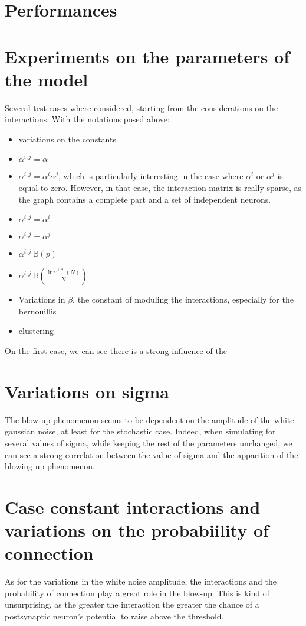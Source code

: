 \section{Performances}

\section{Experiments on the parameters of the model}
Several test cases where considered, starting from the considerations on the interactions. With the notations posed above:\\
	\begin{itemize}
		\item variations on the constants
		\item $ \alpha^{i,j}=\alpha $
		\item $ \alpha^{i,j}=\alpha^i\alpha^j $, which is particularly interesting in the case where $ \alpha^i\text{ or }\alpha^j $ is equal to zero. However, in that case, the interaction matrix is really sparse, as the graph contains a complete part and a set of independent neurons.
		\item $ \alpha^{i,j}=\alpha^i $
		\item $ \alpha^{i,j}=\alpha^j $
		\item $ \alpha^{i,j}~\mathbb{B}(p) $
		\item $ \alpha^{i,j}~\mathbb{B}(\frac{\ln^{\frac{1}{2},1,2}(N)}{N}) $
		\item Variations in $ \beta $, the constant of moduling the interactions, especially for the bernouillis
		\item clustering
	\end{itemize}
	On the first case, we can see there is a strong influence of the 

	\section{Variations on sigma}
	The blow up phenomenon seems to be dependent on the amplitude of the white gaussian noise, at least for the stochastic case. Indeed, when simulating for several values of sigma, while keeping the rest of the parameters unchanged, we can see a strong correlation between the value of sigma and the apparition of the blowing up phenomenon.

	\section{Case constant interactions and variations on the probabiility of connection}
	As for the variations in the white noise amplitude, the interactions and the probability of connection play a great role in the blow-up. This is kind of unsurprising, as the greater the interaction the greater the chance of a postsynaptic neuron's potential to raise above the threshold.

